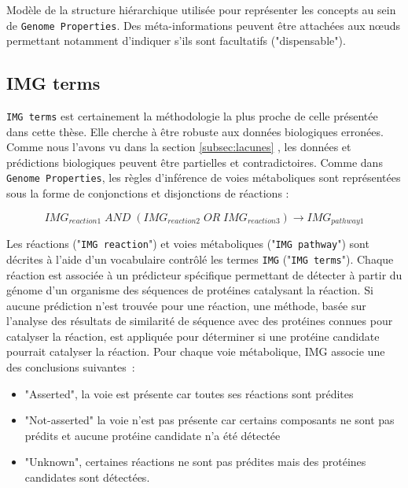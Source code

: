 \begin{refsegment}
\begin{shadedfigure}
\begin{tikzpicture}
            
        \end{tikzpicture}
        \caption{Modèle de la structure hiérarchique utilisée pour représenter les concepts au sein de \texttt{Genome Properties}. Des méta-informations peuvent être attachées aux nœuds permettant notamment d'indiquer s'ils sont facultatifs ("dispensable").  }
        \label{fig:gp_modele}
    \end{shadedfigure}
    
    \subsection{IMG terms}
    
    \texttt{IMG terms} \cite{chen2013improving} est certainement la méthodologie la plus proche de celle présentée dans cette thèse. Elle cherche à être robuste aux données biologiques erronées. Comme nous l’avons vu dans la section \ref{subsec:lacunes} , les données et prédictions biologiques peuvent être partielles et contradictoires. Comme dans \texttt{Genome Properties}, les règles d’inférence de voies métaboliques sont représentées sous la forme de conjonctions et disjonctions de réactions :
    
    \begin{equation}
    IMG_{reaction1} \; AND \; (IMG_{reaction2} \; OR \; IMG_{reaction3} ) \to IMG_{pathway 1}
    \end{equation}
    
    Les réactions ("\texttt{IMG reaction}") et voies métaboliques ("\texttt{IMG pathway}") sont décrites à l’aide d’un vocabulaire contrôlé les termes \texttt{IMG} ("\texttt{IMG terms}"). Chaque réaction est associée à un prédicteur spécifique permettant de détecter à partir du génome d’un organisme des séquences de protéines catalysant la réaction. Si aucune prédiction n’est trouvée pour une réaction, une méthode, basée sur l’analyse des résultats de similarité de séquence avec des protéines connues pour catalyser la réaction, est appliquée pour déterminer si une protéine candidate pourrait catalyser la réaction. Pour chaque voie métabolique, IMG associe une des conclusions suivantes :
    \begin{itemize}
        \item "Asserted", la voie est présente car toutes ses réactions sont prédites
        \item "Not-asserted" la voie n’est pas présente car certains composants ne sont pas prédits et aucune protéine candidate n’a été détectée
        \item "Unknown", certaines réactions ne sont pas prédites mais des protéines candidates sont détectées.
    \end{itemize}


\end{refsegment}
